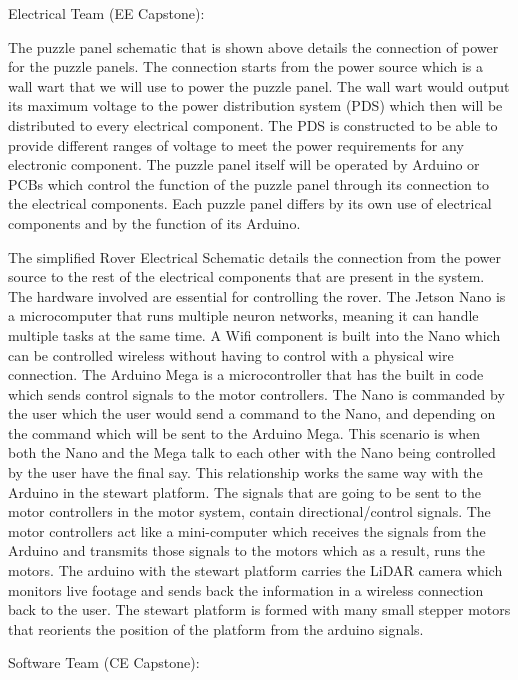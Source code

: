 \documentclass[a4paper, 10pt]{article}
\begin{document}
	Electrical Team (EE Capstone):
	
The puzzle panel schematic that is shown above details the connection of power for the puzzle panels. The connection starts from the power source which is a wall wart that we will use to power the puzzle panel. The wall wart would output its maximum voltage to the power distribution system (PDS) which then will be distributed to every electrical component. The PDS is constructed to be able to provide different ranges of voltage to meet the power requirements for any electronic component. The puzzle panel itself will be operated by Arduino or PCBs which control the function of the puzzle panel through its connection to the electrical components. Each puzzle panel differs by its own use of electrical components and by the function of its Arduino. 
	
	The simplified Rover Electrical Schematic details the connection from the power source to the rest of the electrical components that are present in the system. The hardware involved are essential for controlling the rover. The Jetson Nano is a microcomputer that runs multiple neuron networks, meaning it can handle multiple tasks at the same time. A Wifi component is built into the Nano which can be controlled wireless without having to control with a physical wire connection. The Arduino Mega is a microcontroller that has the built in code which sends control signals to the motor controllers. The Nano is commanded by the user which the user would send a command to the Nano, and depending on the command which will be sent to the Arduino Mega. This scenario is when both the Nano and the Mega talk to each other with the Nano being controlled by the user have the final say. This relationship works the same way with the Arduino in the stewart platform. The signals that are going to be sent to the motor controllers in the motor system, contain directional/control signals. The motor controllers act like a mini-computer which receives the signals from the Arduino and transmits those signals to the motors which as a result, runs the motors. The arduino with the stewart platform carries the LiDAR camera which monitors live footage and sends back the information in a wireless connection back to the user. The stewart platform is formed with many small stepper motors that reorients the position of the platform from the arduino signals.  

	
Software Team (CE Capstone):
\end{document}
